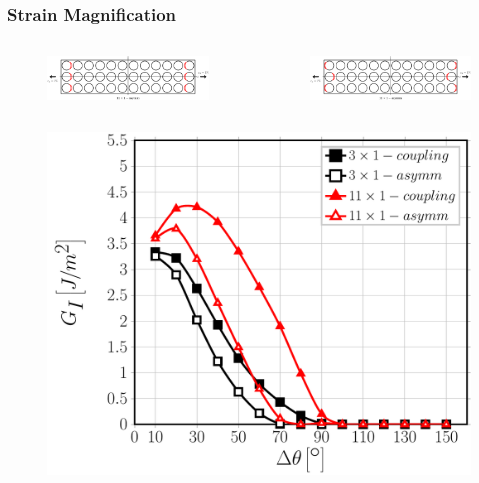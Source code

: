 \documentclass[first,firstsupp,lastsupp,last,hyperref,table]{ETHclass}
\begin{document}
\addtocounter{framenumber}{-1}

\begin{frame}
\frametitle{\vspace{0.2cm}\small Strain Magnification}
\vspace{-1cm}
\centering
\begin{columns}[c]
\centering
\begin{column}{0.5\textwidth}
\centering
\begin{figure}
\centering
\includegraphics[width=0.75\columnwidth]{twofibers-sameside-strainmagni11.pdf}
\end{figure}
\end{column}
\begin{column}{0.5\textwidth}
\centering
\begin{figure}
\centering
\includegraphics[width=0.75\columnwidth]{twofibers-oppositeside-strainmagni11.pdf}
\end{figure}
\end{column}
\end{columns}
\vspace{-0.35cm}
\begin{columns}[c]
\centering
\begin{column}{0.5\textwidth}
\centering
\begin{figure}
\centering
\includegraphics[width=\columnwidth]{nx1-coupling-vf60-GI-strainmagn11.pdf}

\end{figure}
\end{column}
\end{columns}
\end{frame}
\end{document}
